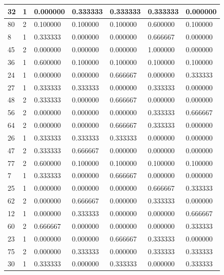 {\begin{tabular}{|l|l|l|l|l|l|l|}
        32 & 1 & 0.000000 & 0.333333 & 0.333333 & 0.333333 & 0.000000 \\ \hline
        80 & 2 & 0.100000 & 0.100000 & 0.100000 & 0.600000 & 0.100000 \\ \hline
        8 & 1 & 0.333333 & 0.000000 & 0.000000 & 0.666667 & 0.000000 \\ \hline
        45 & 2 & 0.000000 & 0.000000 & 0.000000 & 1.000000 & 0.000000 \\ \hline
        36 & 1 & 0.600000 & 0.100000 & 0.100000 & 0.100000 & 0.100000 \\ \hline
        24 & 1 & 0.000000 & 0.000000 & 0.666667 & 0.000000 & 0.333333 \\ \hline
        27 & 1 & 0.333333 & 0.333333 & 0.000000 & 0.333333 & 0.000000 \\ \hline
        48 & 2 & 0.333333 & 0.000000 & 0.666667 & 0.000000 & 0.000000 \\ \hline
        56 & 2 & 0.000000 & 0.000000 & 0.000000 & 0.333333 & 0.666667 \\ \hline
        64 & 2 & 0.000000 & 0.000000 & 0.666667 & 0.333333 & 0.000000 \\ \hline
        26 & 1 & 0.333333 & 0.333333 & 0.333333 & 0.000000 & 0.000000 \\ \hline
        47 & 2 & 0.333333 & 0.666667 & 0.000000 & 0.000000 & 0.000000 \\ \hline
        77 & 2 & 0.600000 & 0.100000 & 0.100000 & 0.100000 & 0.100000 \\ \hline
        7 & 1 & 0.333333 & 0.000000 & 0.666667 & 0.000000 & 0.000000 \\ \hline
        25 & 1 & 0.000000 & 0.000000 & 0.000000 & 0.666667 & 0.333333 \\ \hline
        62 & 2 & 0.000000 & 0.666667 & 0.000000 & 0.333333 & 0.000000 \\ \hline
        12 & 1 & 0.000000 & 0.333333 & 0.000000 & 0.000000 & 0.666667 \\ \hline
        60 & 2 & 0.666667 & 0.000000 & 0.000000 & 0.000000 & 0.333333 \\ \hline
        23 & 1 & 0.000000 & 0.000000 & 0.666667 & 0.333333 & 0.000000 \\ \hline
        75 & 2 & 0.000000 & 0.333333 & 0.000000 & 0.333333 & 0.333333 \\ \hline
        30 & 1 & 0.333333 & 0.000000 & 0.333333 & 0.000000 & 0.333333 \\ \hline
        \midrule   
\end{tabular}\hfill \hspace{3mm}
}
